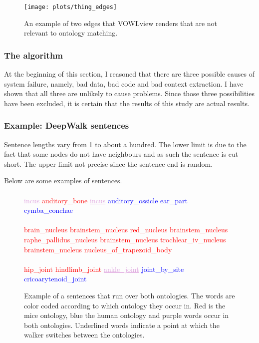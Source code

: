 \documentclass{article}
\begin{document}
  \begin{figure}
  \centering
  \texttt{[image: plots/thing\_edges]}
  \caption[Addition edges example]{An example of two edges that VOWLview renders that are not relevant to ontology matching.}
  \label{thing_edges}
  \end{figure}
  
  \subsubsection{The algorithm}
  At the beginning of this section, I reasoned that there are three possible causes of system failure, namely, bad data, bad code and bad context extraction. I have shown that all three are unlikely to cause problems. Since those three possibilities have been excluded, it is certain that the results of this study are actual results.
 
 \subsubsection{Example: DeepWalk sentences} \label{sentences}
 Sentence lengths vary from 1 to about a hundred. The lower limit is due to the fact that some nodes do not have neighbours and as such the sentence is cut short. The upper limit not precise since the sentence end is random.
 
 Below are some examples of sentences.
 \begin{figure}[H]
 \paragraph{}
 \textcolor{Plum}{incus} \textcolor{red}{auditory\_bone} \textcolor{Plum}{\underline{incus}} \textcolor{blue}{ auditory\_ossicle ear\_part cymba\_conchae}
 \paragraph{}
  \textcolor{red}{brain\_nucleus brainstem\_nucleus red\_nucleus brainstem\_nucleus raphe\_pallidus\_nucleus brainstem\_nucleus trochlear\_iv\_nucleus brainstem\_nucleus nucleus\_of\_trapezoid\_body}
  \paragraph{}
  \textcolor{red}{hip\_joint hindlimb\_joint} \textcolor{Plum}{\underline{ankle\_joint}} \textcolor{blue}{joint\_by\_site cricoarytenoid\_joint}
  \label{jumpingsentence}
  \caption[Sentence that runs over both ontologies]{Example of a sentences that run over both ontologies. The words are color coded according to which ontology they occur in. Red is the mice ontology, blue the human ontology and purple words occur in both ontologies. Underlined words indicate a point at which the walker switches between the ontologies.}
 \end{figure}
 
\end{document}

